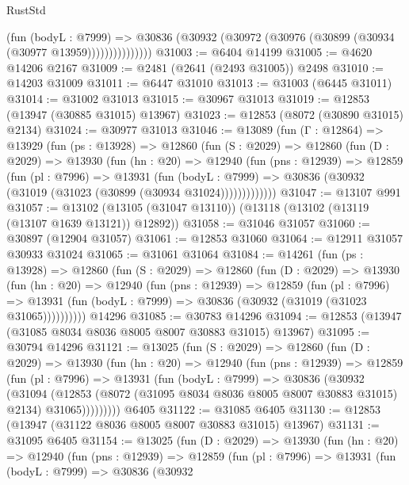 \begin{lexlean}{RustStd}
\begin{coremodule}
                    (fun (bodyL : @7999) =>
                    @30836 (@30932 (@30972 (@30976 (@30899 (@30934 (@30977 @13959)))))))))))))))
@31003 := @6404 @14199
@31005 := @4620 @14206 @2167
@31009 := @2481 (@2641 (@2493 @31005)) @2498
@31010 := @14203 @31009
@31011 := @6447 @31010
@31013 := @31003 (@6445 @31011)
@31014 := @31002 @31013
@31015 := @30967 @31013
@31019 := @12853 (@13947 (@30885 @31015) @13967)
@31023 := @12853 (@8072 (@30890 @31015) @2134)
@31024 := @30977 @31013
@31046 := @13089
    (fun (Γ : @12864) =>
    @13929
      (fun (ps : @13928) =>
      @12860
        (fun (S : @2029) =>
        @12860
          (fun (D : @2029) =>
          @13930
            (fun (hn : @20) =>
            @12940
              (fun (pns : @12939) =>
              @12859
                (fun (pl : @7996) =>
                @13931
                  (fun (bodyL : @7999) =>
                  @30836 (@30932 (@31019 (@31023 (@30899 (@30934 @31024)))))))))))))
@31047 := @13107 @991
@31057 := @13102 (@13105 (@31047 @13110)) (@13118 (@13102 (@13119 (@13107 @1639 @13121)) @12892))
@31058 := @31046 @31057
@31060 := @30897 (@12904 @31057)
@31061 := @12853 @31060
@31064 := @12911 @31057 @30933 @31024
@31065 := @31061 @31064
@31084 := @14261
    (fun (ps : @13928) =>
    @12860
      (fun (S : @2029) =>
      @12860
        (fun (D : @2029) =>
        @13930
          (fun (hn : @20) =>
          @12940
            (fun (pns : @12939) =>
            @12859
              (fun (pl : @7996) =>
              @13931 (fun (bodyL : @7999) => @30836 (@30932 (@31019 (@31023 @31065))))))))))
    @14296
@31085 := @30783 @14296
@31094 := @12853 (@13947 (@31085 @8034 @8036 @8005 @8007 @30883 @31015) @13967)
@31095 := @30794 @14296
@31121 := @13025
    (fun (S : @2029) =>
    @12860
      (fun (D : @2029) =>
      @13930
        (fun (hn : @20) =>
        @12940
          (fun (pns : @12939) =>
          @12859
            (fun (pl : @7996) =>
            @13931
              (fun (bodyL : @7999) =>
              @30836
                (@30932
                  (@31094
                    (@12853
                      (@8072 (@31095 @8034 @8036 @8005 @8007 @30883 @31015) @2134)
                      @31065)))))))))
    @6405
@31122 := @31085 @6405
@31130 := @12853 (@13947 (@31122 @8036 @8005 @8007 @30883 @31015) @13967)
@31131 := @31095 @6405
@31154 := @13025
    (fun (D : @2029) =>
    @13930
      (fun (hn : @20) =>
      @12940
        (fun (pns : @12939) =>
        @12859
          (fun (pl : @7996) =>
          @13931
            (fun (bodyL : @7999) =>
            @30836
              (@30932

\end{coremodule}
\end{lexlean}
